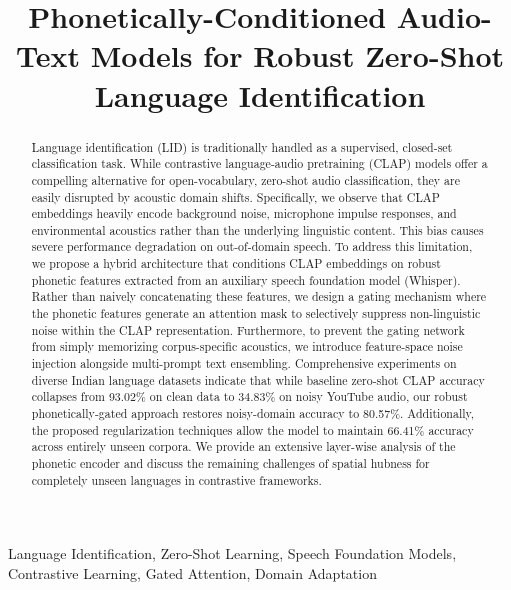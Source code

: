 \documentclass[conference]{IEEEtran}
\begin{document}
\title{Phonetically-Conditioned Audio-Text Models for Robust Zero-Shot Language Identification}

\author{
}

\maketitle

\begin{abstract}
Language identification (LID) is traditionally handled as a supervised, closed-set classification task. While contrastive language-audio pretraining (CLAP) models offer a compelling alternative for open-vocabulary, zero-shot audio classification, they are easily disrupted by acoustic domain shifts. Specifically, we observe that CLAP embeddings heavily encode background noise, microphone impulse responses, and environmental acoustics rather than the underlying linguistic content. This bias causes severe performance degradation on out-of-domain speech. To address this limitation, we propose a hybrid architecture that conditions CLAP embeddings on robust phonetic features extracted from an auxiliary speech foundation model (Whisper). Rather than naively concatenating these features, we design a gating mechanism where the phonetic features generate an attention mask to selectively suppress non-linguistic noise within the CLAP representation. Furthermore, to prevent the gating network from simply memorizing corpus-specific acoustics, we introduce feature-space noise injection alongside multi-prompt text ensembling. Comprehensive experiments on diverse Indian language datasets indicate that while baseline zero-shot CLAP accuracy collapses from 93.02\% on clean data to 34.83\% on noisy YouTube audio, our robust phonetically-gated approach restores noisy-domain accuracy to 80.57\%. Additionally, the proposed regularization techniques allow the model to maintain 66.41\% accuracy across entirely unseen corpora. We provide an extensive layer-wise analysis of the phonetic encoder and discuss the remaining challenges of spatial hubness for completely unseen languages in contrastive frameworks.
\end{abstract}

\begin{IEEEkeywords}
Language Identification, Zero-Shot Learning, Speech Foundation Models, Contrastive Learning, Gated Attention, Domain Adaptation
\end{IEEEkeywords}
\end{document}

